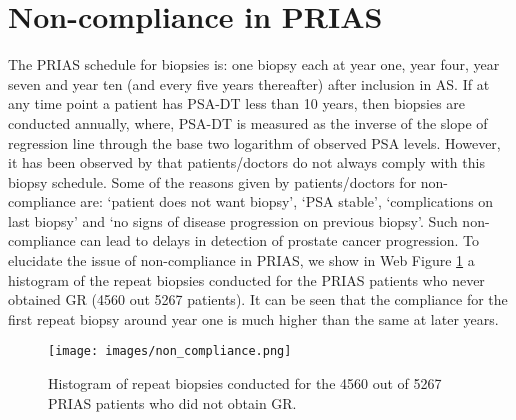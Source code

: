 
\section{Non-compliance in PRIAS}
The PRIAS schedule for biopsies is: one biopsy each at year one, year four, year seven and year ten (and every five years thereafter) after inclusion in AS. If at any time point a patient has PSA-DT less than 10 years, then biopsies are conducted annually, where, PSA-DT is measured as the inverse of the slope of regression line through the base two logarithm of observed PSA levels. However, it has been observed by \citet{bokhorst2015compliance} that patients/doctors do not always comply with this biopsy schedule. Some of the reasons given by patients/doctors for non-compliance are: `patient does not want biopsy', `PSA stable', `complications on last biopsy' and `no signs of disease progression on previous biopsy'. Such non-compliance can lead to delays in detection of prostate cancer progression. To elucidate the issue of non-compliance in PRIAS, we show in Web Figure \ref{web_fig : non_compliance} a histogram of the repeat biopsies conducted for the PRIAS patients who never obtained GR (4560 out 5267 patients). It can be seen that the compliance for the first repeat biopsy around year one is much higher than the same at later years.

\begin{figure}
\centerline{
\texttt{[image: images/non\_compliance.png]}
}
\caption{Histogram of repeat biopsies conducted for the 4560 out of 5267 PRIAS patients who did not obtain GR.}
\label{web_fig : non_compliance}
\end{figure}